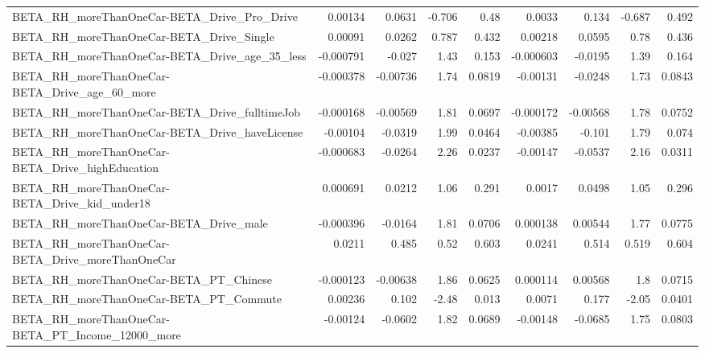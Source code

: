 \begin{tabular}{lrrrrrrrr}
BETA\_RH\_moreThanOneCar-BETA\_Drive\_Pro\_Drive        &     0.00134 &       0.0631 &   -0.706 &     0.48 &     0.0033 &       0.134 &       -0.687 &         0.492 \\
BETA\_RH\_moreThanOneCar-BETA\_Drive\_Single           &     0.00091 &       0.0262 &    0.787 &    0.432 &    0.00218 &      0.0595 &         0.78 &         0.436 \\
BETA\_RH\_moreThanOneCar-BETA\_Drive\_age\_35\_less      &   -0.000791 &       -0.027 &     1.43 &    0.153 &  -0.000603 &     -0.0195 &         1.39 &         0.164 \\
BETA\_RH\_moreThanOneCar-BETA\_Drive\_age\_60\_more      &   -0.000378 &     -0.00736 &     1.74 &   0.0819 &   -0.00131 &     -0.0248 &         1.73 &        0.0843 \\
BETA\_RH\_moreThanOneCar-BETA\_Drive\_fulltimeJob      &   -0.000168 &     -0.00569 &     1.81 &   0.0697 &  -0.000172 &    -0.00568 &         1.78 &        0.0752 \\
BETA\_RH\_moreThanOneCar-BETA\_Drive\_haveLicense      &    -0.00104 &      -0.0319 &     1.99 &   0.0464 &   -0.00385 &      -0.101 &         1.79 &         0.074 \\
BETA\_RH\_moreThanOneCar-BETA\_Drive\_highEducation    &   -0.000683 &      -0.0264 &     2.26 &   0.0237 &   -0.00147 &     -0.0537 &         2.16 &        0.0311 \\
BETA\_RH\_moreThanOneCar-BETA\_Drive\_kid\_under18      &    0.000691 &       0.0212 &     1.06 &    0.291 &     0.0017 &      0.0498 &         1.05 &         0.296 \\
BETA\_RH\_moreThanOneCar-BETA\_Drive\_male             &   -0.000396 &      -0.0164 &     1.81 &   0.0706 &   0.000138 &     0.00544 &         1.77 &        0.0775 \\
BETA\_RH\_moreThanOneCar-BETA\_Drive\_moreThanOneCar   &      0.0211 &        0.485 &     0.52 &    0.603 &     0.0241 &       0.514 &        0.519 &         0.604 \\
BETA\_RH\_moreThanOneCar-BETA\_PT\_Chinese             &   -0.000123 &     -0.00638 &     1.86 &   0.0625 &   0.000114 &     0.00568 &          1.8 &        0.0715 \\
BETA\_RH\_moreThanOneCar-BETA\_PT\_Commute             &     0.00236 &        0.102 &    -2.48 &    0.013 &     0.0071 &       0.177 &        -2.05 &        0.0401 \\
BETA\_RH\_moreThanOneCar-BETA\_PT\_Income\_12000\_more   &    -0.00124 &      -0.0602 &     1.82 &   0.0689 &   -0.00148 &     -0.0685 &         1.75 &        0.0803 \\

\end{tabular}
